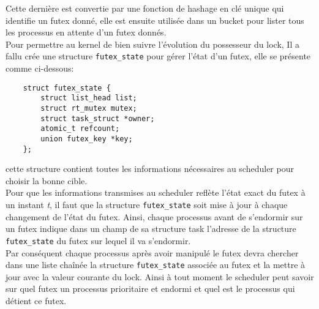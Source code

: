 Cette dernière est convertie par une fonction de hashage en clé unique qui 
identifie un futex donné, elle est ensuite utilisée dans un bucket pour lister
tous les processus en attente d'un futex donnés.
\\

Pour permettre au kernel de bien suivre l'évolution du possesseur du lock, Il a
fallu crée une structure \verb|futex_state| pour gérer l'état d'un futex, elle se
présente comme ci-dessous:
\begin{lstlisting}
	struct futex_state {
		struct list_head list;
		struct rt_mutex mutex;
		struct task_struct *owner;
		atomic_t refcount;
		union futex_key *key;
	};

\end{lstlisting}
cette structure contient toutes les informations nécessaires au scheduler pour 
choisir la bonne cible.
\\

Pour que les informations transmises au scheduler reflète l'état exact du futex
à un instant \textit{t}, il faut que la structure \verb|futex_state| soit mise à jour
à chaque changement de l'état du futex. Ainsi, chaque processus avant de 
s'endormir sur un futex indique dans un champ de sa structure task l'adresse de 
la structure \verb|futex_state| du futex sur lequel il va s'endormir.
\\

Par conséquent chaque processus après avoir manipulé le futex 
devra chercher dans une liste chaînée la structure \verb|futex_state| associée au 
futex et la mettre à jour avec la valeur courante du lock. Ainsi à tout moment 
le scheduler peut savoir sur quel futex un processus prioritaire et endormi 
et quel est le processus qui détient ce futex.